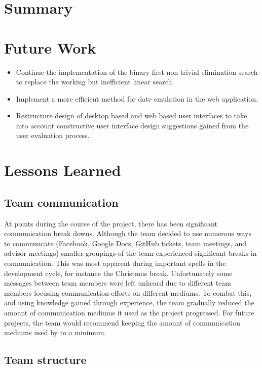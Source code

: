 \section{Summary}

\section{Future Work}

\begin{itemize}
\item Continue the implementation of the binary first non-trivial elimination
search to replace the working but inefficient linear search.
\item Implement a more efficient method for date emulation in the web
application.
\item Restructure design of desktop based and web based user interfaces to 
take into account constructive user interface design suggestions gained from 
the user evaluation process. 
 \end{itemize}

\section{Lessons Learned}

\subsection{Team communication}

At points during the course of the project, there has been significant 
communication break downs. Although the team decided to use numerous ways to 
communicate (Facebook, Google Docs, GitHub tickets, team meetings, and advisor 
meetings) smaller groupings of the team experienced significant breaks in 
communication. This was most apparent during important spells in the 
development cycle, for instance the Christmas break. Unfortunately some 
messages between team members were left unheard due to different team members 
focusing communication efforts on different mediums. To combat this, and using 
knowledge gained through experience, the team gradually reduced the amount of 
communication mediums it used as the project progressed. For future projects, 
the team would recommend keeping the amount of communication mediums used by 
to a minimum.      

\subsection{Team structure}


